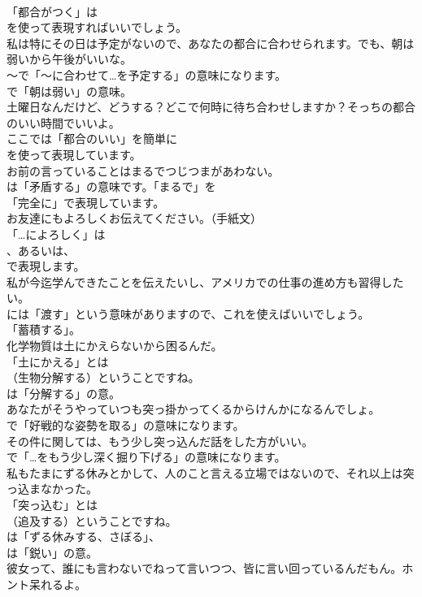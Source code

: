 \documentclass[8pt]{extreport}
\begin{document}
\begin{CJK}{UTF8}{min}
\\	「都合がつく」は 
\\	を使って表現すればいいでしょう。	
\\	私は特にその日は予定がないので、あなたの都合に合わせられます。でも、朝は弱いから午後がいいな。 
\\	～で「～に合わせて…を予定する」の意味になります。
\\	で「朝は弱い」の意味。	
\\	土曜日なんだけど、どうする？どこで何時に待ち合わせしますか？そっちの都合のいい時間でいいよ。 
\\	ここでは「都合のいい」を簡単に 
\\	を使って表現しています。	
\\	お前の言っていることはまるでつじつまがあわない。 
\\	は「矛盾する」の意味です。「まるで」を
\\	「完全に」で表現しています。	
\\	お友達にもよろしくお伝えてください。（手紙文） 
\\	「…によろしく」は
\\	、あるいは、
\\	で表現します。	
\\	私が今迄学んできたことを伝えたいし、アメリカでの仕事の進め方も習得したい。 
\\	には「渡す」という意味がありますので、これを使えばいいでしょう。
\\	「蓄積する」。	
\\	化学物質は土にかえらないから困るんだ。 
\\	「土にかえる」とは
\\	（生物分解する）ということですね。
\\	は「分解する」の意。	
\\	あなたがそうやっていつも突っ掛かってくるからけんかになるんでしょ。 
\\	で「好戦的な姿勢を取る」の意味になります。	
\\	その件に関しては、もう少し突っ込んだ話をした方がいい。 
\\	で「…をもう少し深く掘り下げる」の意味になります。	
\\	私もたまにずる休みとかして、人のこと言える立場ではないので、それ以上は突っ込まなかった。 
\\	「突っ込む」とは
\\	（追及する）ということですね。
\\	は「ずる休みする、さぼる」、
\\	は「鋭い」の意。	
\\	彼女って、誰にも言わないでねって言いつつ、皆に言い回っているんだもん。ホント呆れるよ。 

\end{CJK}
\end{document}
